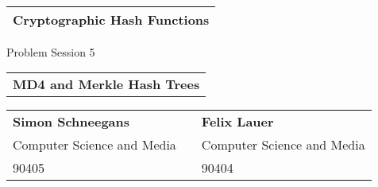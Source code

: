 \thispagestyle{empty}
\ \\[3cm]
\begin{tabular}[b]{l}
    \Huge \textbf{Cryptographic Hash Functions} \hspace{12.5cm} \\[1mm]
    \hline
\end{tabular}

\begin{flushright}
    {\large Problem Session 5} \\[8cm]
\end{flushright}

\begin{tabular}[b]{l}
    \LARGE \textbf{MD4 and Merkle Hash Trees} \\[4cm]
\end{tabular}

\begin{tabular}{lcl}
    \textbf{Simon Schneegans} &\hspace{1cm} & \textbf{Felix Lauer} \\
    Computer Science and Media & \hspace{1cm}  & Computer Science and Media\\
    90405  &\hspace{1cm} & 90404 \\[1.5cm]
\end{tabular}

\newpage

